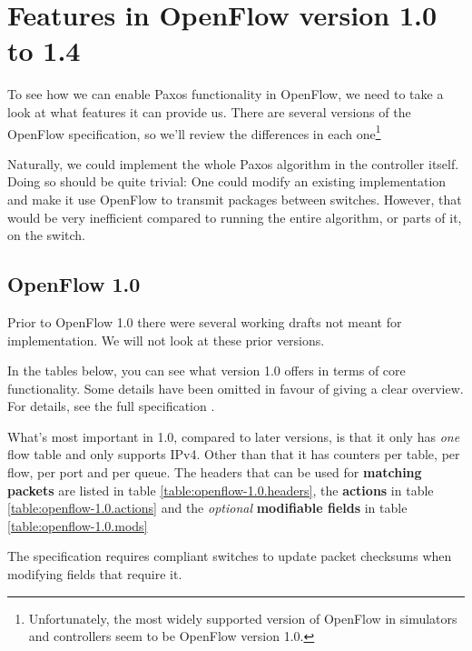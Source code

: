 \section{Features in OpenFlow version 1.0 to 1.4}


To see how we can enable Paxos functionality in OpenFlow, we need to take a
look at what features it can provide us.  There are several versions of the
OpenFlow specification, so we'll review the differences in each
one\footnote{Unfortunately, the most widely supported version of OpenFlow in
simulators and controllers seem to be OpenFlow version 1.0.}

Naturally, we could implement the whole Paxos algorithm in the controller
itself.  Doing so should be quite trivial: One could modify an existing
implementation and make it use OpenFlow to transmit packages between
switches.  However, that would be very inefficient compared to running the
entire algorithm, or parts of it, on the switch.

\subsection{OpenFlow 1.0}

Prior to OpenFlow 1.0 \cite{openflow-1.0.0} there were several working
drafts not meant for implementation.  We will not look at these prior
versions.

In the tables below, you can see what version 1.0 offers in terms of core
functionality.  Some details have been omitted in favour of giving a clear
overview.  For details, see the full specification \cite{openflow-1.0.0}.

What's most important in 1.0, compared to later versions, is that it only
has {\em one} flow table and only supports IPv4.  Other than that it has
counters per table, per flow, per port and per queue.  The headers that can
be used for \textbf{matching packets} are listed in table
\ref{table:openflow-1.0.headers}, the \textbf{actions} in table
\ref{table:openflow-1.0.actions} and the {\em optional} \textbf{modifiable
  fields} in table \ref{table:openflow-1.0.mods}

The specification requires compliant switches to update packet checksums
when modifying fields that require it.

